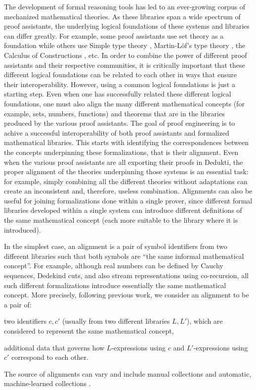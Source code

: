The development of formal reasoning tools has led to an ever-growing
corpus of mechanized mathematical theories. As these libraries span a
wide spectrum of proof assistants, the underlying logical foundations
of these systems and libraries can differ greatly. For example, some
proof assistants use set theory as a foundation while others use
Simple type theory \cite{Church40}, Martin-L\"of's type theory
\cite{Martin-Lof84}, the Calculus of Constructions
\cite{CoquandHuet88}, etc.  In order to combine the power of different
proof assistants and their respective communities, it is critically
important that these different logical foundations can be related to
each other in ways that ensure their interoperability. However, using
a common logical foundations is just a starting step. Even when one
has successfully related these different logical foundations, one must
also align the many different mathematical concepts (for example, sets,
numbers, functions) and theorems that are in the libraries produced by
the various proof assistants. The goal of proof engineering is to
achive a successful interoperability of both proof assistants and
formalized mathematical libraries. This starts with identifying the
correspondences between the concepts underpinning these
formalizations, that is their alignment. Even when the various proof
assistants are all exporting their proofs in Dedukti, the proper
alignment of the theories underpinning those systems is an essential
task: for example, simply combining all the different theories without
adaptations can create an inconsistent and, therefore, useless
combination.
%
Alignments can also be useful for joining formalizations done within a
single prover, since different formal libraries developed within a
single system can introduce different definitions of the same
mathematical concept (each more suitable to the library where it is
introduced).

In the simplest case, an alignment is a pair of symbol identifiers
from two different libraries such that both symbols are ``the same
informal mathematical concept''. For example, although real numbers
can be defined by Cauchy sequences, Dedekind cuts, and also stream
representations using co-recursion, all such different formalizations
introduce essentially the same mathematical concept. More precisely,
following previous work\cite{GKKMR:alignments:17,
DBLP:conf/mkm/DehayeIKKLMPRTW16}, we
consider an alignment to be a pair of:
\begin{compactitem}
  \item two identifiers $c,c'$ (usually from two different libraries
    $L,L'$), which are considered to represent the same mathematical
    concept,
  \item additional data that governs how $L$-expressions using $c$ and
    $L'$-expressions using $c'$ correspond to each other.
\end{compactitem}
The source of alignments can vary and include manual collections
\cite{MRLR:alignments:17} and automatic, machine-learned collections
\cite{GAUTHIER201989}.

